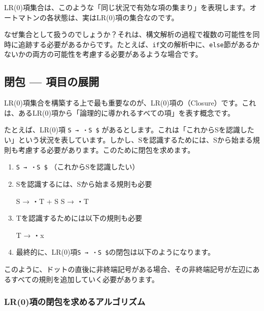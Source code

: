 LR(0)項集合は、このような「同じ状況で有効な項の集まり」を表現します。オートマトンの各状態は、実はLR(0)項の集合なのです。

なぜ集合として扱うのでしょうか？それは、構文解析の過程で複数の可能性を同時に追跡する必要があるからです。たとえば、\texttt{if}文の解析中に、\texttt{else}節があるかないかの両方の可能性を考慮する必要があるような場合です。

\subsection{閉包 --- 項目の展開}

LR(0)項集合を構築する上で最も重要なのが、LR(0)項の（Closure）です。これは、あるLR(0)項から「論理的に導かれるすべての項」を表す概念です。

たとえば、LR(0)項 \texttt{S\textquotesingle{}\ →\ ・S\ \$}
があるとします。これは「これからSを認識したい」という状況を表しています。しかし、Sを認識するためには、Sから始まる規則も考慮する必要があります。このために閉包を求めます。

\begin{enumerate}
\item
  \texttt{S\textquotesingle{}\ →\ ・S\ \$} （これからSを認識したい）
\item
  Sを認識するには、Sから始まる規則も必要

\begin{codescreen}{}
S → ・T + S
S → ・T
\end{codescreen}

\item
  Tを認識するためには以下の規則も必要

\begin{codescreen}{}
T → ・x
\end{codescreen}

\item
  最終的に、LR(0)項\texttt{S\textquotesingle{}\ →\ ・S\ \$}の閉包は以下のようになります。

\end{enumerate}

このように、ドットの直後に非終端記号がある場合、その非終端記号が左辺にあるすべての規則を追加していく必要があります。

\subsubsection{LR(0)項の閉包を求めるアルゴリズム}

